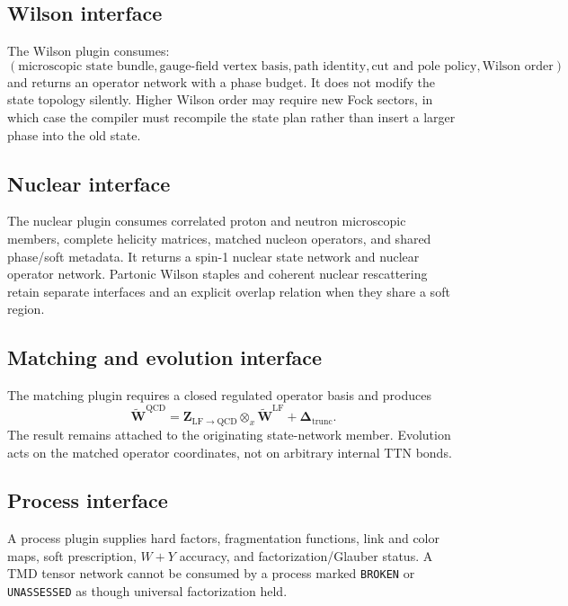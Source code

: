 \documentclass[11pt]{article}
\newcommand{\LF}{\ensuremath{\mathrm{LF}}}
\newcommand{\QCD}{\ensuremath{\mathrm{QCD}}}
\newcommand{\trunc}{\mathrm{trunc}}
\begin{document}
\subsection{Wilson interface}

The Wilson plugin consumes:
\begin{equation}
 \left(
 \text{microscopic state bundle},
 \text{gauge-field vertex basis},
 \text{path identity},
 \text{cut and pole policy},
 \text{Wilson order}
 \right)
\label{eq:wilson-plugin-input}
\end{equation}
and returns an operator network with a phase budget.  It does not modify the
state topology silently.  Higher Wilson order may require new Fock sectors,
in which case the compiler must recompile the state plan rather than insert a
larger phase into the old state.

\subsection{Nuclear interface}

The nuclear plugin consumes correlated proton and neutron microscopic members,
complete helicity matrices, matched nucleon operators, and shared phase/soft
metadata.  It returns a spin-1 nuclear state network and nuclear operator
network.  Partonic Wilson staples and coherent nuclear rescattering retain
separate interfaces and an explicit overlap relation when they share a soft
region.

\subsection{Matching and evolution interface}

The matching plugin requires a closed regulated operator basis and produces
\begin{equation}
 \widetilde{\bm W}^{\QCD}
 =
 \bm Z_{\LF\to\QCD}
 \otimes_x
 \widetilde{\bm W}^{\LF}
 +\bm\Delta_{\trunc}.
\label{eq:matching-plugin}
\end{equation}
The result remains attached to the originating state-network member.  Evolution
acts on the matched operator coordinates, not on arbitrary internal TTN bonds.

\subsection{Process interface}

A process plugin supplies hard factors, fragmentation functions, link and
color maps, soft prescription, \(W+Y\) accuracy, and factorization/Glauber
status.  A TMD tensor network cannot be consumed by a process marked
\texttt{BROKEN} or \texttt{UNASSESSED} as though universal factorization held.
\end{document}
